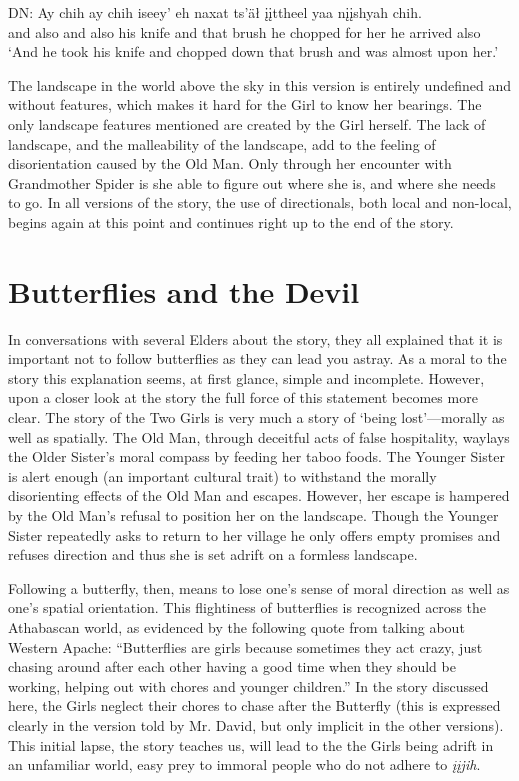 \begin{exe}
\begin{xlist}
\ex \gll DN: Ay chih ay chih iseey' eh naxat ts'äł įįttheel yaa nįįshyah chih.  \\
 { } and also and also {his knife} and that brush {he chopped} {for her} {he arrived} also \\
\glt `And he took his knife and chopped down that brush and was almost upon her.'\\
\end{xlist}
\end{exe}

The landscape in the world above the sky in this version is entirely undefined and without features, which makes it hard for the Girl to know her bearings. The only landscape features mentioned are created by the Girl herself. The lack of landscape, and the malleability of the landscape, add to the feeling of disorientation caused by the Old Man. Only through her encounter with Grandmother Spider is she able to figure out where she is, and where she needs to go.
In all versions of the story, the use of directionals, both local and non-local, begins again at this point and continues right up to the end of the story.

\section{Butterflies and the Devil}
\label{brucks:section:discussion}

In conversations with several Elders about the story, they all explained that it is important not to follow butterflies as they can lead you astray. As a moral to the story this explanation seems, at first glance, simple and incomplete. However, upon a closer look at the story the full force of this statement becomes more clear. The story of the Two Girls is very much a story of `being lost'—morally as well as spatially. The Old Man, through deceitful acts of false hospitality, waylays the Older Sister's moral compass by feeding her taboo foods. The Younger Sister is alert enough (an important cultural trait) to withstand the morally disorienting effects of the Old Man and escapes. However, her escape is hampered by the Old Man's refusal to position her on the landscape. Though the Younger Sister repeatedly asks to return to her village he only offers empty promises and refuses direction and thus she is set adrift on a formless landscape.

Following a butterfly, then, means to lose one's sense of moral direction as well as one's spatial orientation. This flightiness of butterflies is recognized across the Athabascan world, as evidenced by the following quote from \citet[61]{BassoK1990} talking about Western Apache: ``Butterflies are girls because sometimes they act crazy, just chasing around after each other having a good time when they should be working, helping out with chores and younger children.'' In the story discussed here, the Girls neglect their chores to chase after the Butterfly (this is expressed clearly in the version told by Mr. David, but only implicit in the other versions). This initial lapse, the story teaches us, will lead to the the Girls being adrift in an unfamiliar world, easy prey to immoral people who do not adhere to {\em įįjih}.

